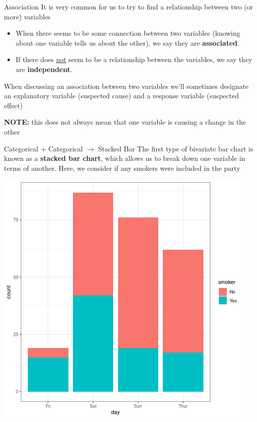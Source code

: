\documentclass{beamer}
\begin{document}
\begin{frame}{Association}
It is very common for us to try to find a relationship between two (or more) variables

\begin{itemize}
    \item When there seems to be some connection between two variables (knowing about one variable tells us about the other), we say they are \textbf{associated}. 
    \item If there does \underline{not} seem to be a relationship between the variables, we say they are \textbf{independent}.
\end{itemize} 
\vspace{3mm}

When discussing an association between two variables we’ll
sometimes designate an explanatory variable (suspected
cause) and a response variable (suspected effect) \vspace{3mm}

\textbf{NOTE:} this does not always mean that one variable is causing a change in the other
\end{frame}


\begin{frame}{Categorical + Categorical $\rightarrow$ Stacked Bar}
The first type of bivariate bar chart is known as a \textbf{stacked bar chart}, which allows us to break down one variable in terms of another. Here, we consider if any smokers were included in the party

\begin{center}
\includegraphics[scale=0.35]{img/bar_stacked.png}
\end{center}

\end{frame}
\end{document}
